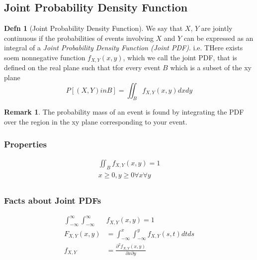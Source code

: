 \documentclass[10pt,letterpaper,final,twoside,notitlepage]{article}
\theoremstyle{plain}
\theoremstyle{definition}
\newtheorem{definition}{Defn}
\newtheorem{remark}{Remark}[definition]
\begin{document}
	\subsection[Joint PDF]{Joint Probability Density Function} \label{subsec:Joint PDF}
		\begin{definition}[Joint Probability Density Function] \label{def:Joint PDF}
			We say that $X$, $Y$ are jointly continuous if the probabilities of events involving $X$ and $Y$ can be expressed as an integral of a \emph{Joint Probability Density Function (Joint PDF)}. \newline
			i.e. THere exists soem nonnegative function $f_{X,Y} \left( x,y \right)$, which we call the joint PDF, that is defined on the real plane such that tfor every event $B$ which is a subset of the xy plane
			\begin{equation}\label{eq:Joint PDF}
				P \left[ \left( X,Y \right) in B \right] = \iint_{B} f_{X,Y} \left( x,y \right) dx dy
			\end{equation}
			\begin{remark}
				The probability mass of an event is found by integrating the PDF over the region in the xy plane corresponding to your event.
			\end{remark}
		\end{definition}
	
		\subsubsection{Properties} \label{subsubsec:Joint PDF Properties}
			\begin{gather}
				\iint_{B} f_{X,Y} \left( x,y \right) = 1 \\
				x \geq 0, y \geq 0 \forall x \forall y \\
			\end{gather}
			
		\subsubsection{Facts about Joint PDFs} \label{subsubsec:Joint PDF Facts}
			\begin{align}
				\int_{-\infty}^{\infty} \int_{-\infty}^{\infty} &f_{X,Y} \left( x,y \right) = 1 \\
				F_{X,Y} \left( x,y \right) &= \int_{-\infty}^{x} \int_{-\infty}^{y} f_{X,Y} \left( s,t \right) dt ds \\
				f_{X,Y} &= \frac{\partial^{2} f_{X,Y} \left( x,y \right)}{\partial x \partial y} \\
			\end{align}
			
\end{document}
